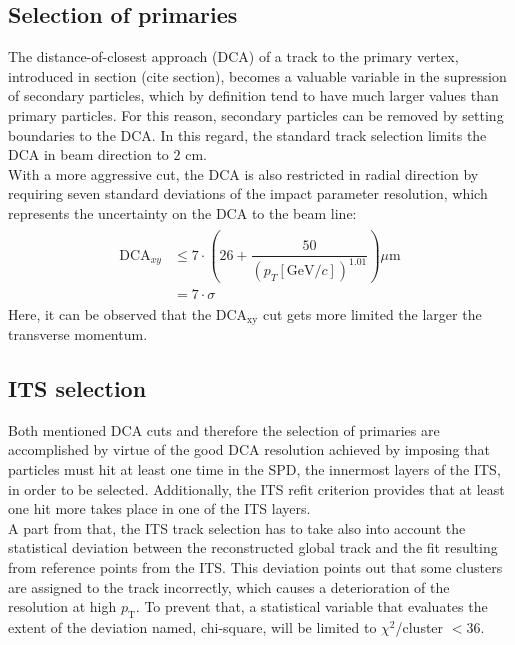 \documentclass[12pt,a4paper]{report}
\begin{document}
\subsection{Selection of primaries}
\label{sec:SelOfPrim}
The distance-of-closest approach (DCA) of a track to the primary vertex, introduced in section (cite section), becomes a valuable variable in the supression of secondary particles, which by definition tend to have much larger values than primary particles. For this reason, secondary particles can be removed by setting boundaries to the DCA. In this regard, the standard track selection limits the DCA in beam direction to $2$ cm.\\
With a more aggressive cut, the DCA is also restricted in radial direction by requiring seven standard deviations of the impact parameter resolution, which represents the uncertainty on the DCA to the beam line: %
\begin{align}
\begin{split}
\text{DCA}_{xy} &\leq 7 \cdot \left(26 + \dfrac{50}{(p_{T}[\text{GeV}/c])^{1.01}}\right) \mu \text{m} \\
& = 7\cdot \sigma
\end{split}
\end{align}
Here, it can be observed that the DCA$_{\text{xy}}$ cut gets more limited the larger the transverse momentum. 
\subsection{ITS selection}
Both mentioned DCA cuts and therefore the selection of primaries are accomplished by virtue of the good DCA resolution achieved by imposing that particles must hit at least one time in the SPD, the innermost layers of the ITS, in order to be selected. Additionally, the ITS refit criterion provides that at least one hit more takes place in one of the ITS layers. \\
A part from that, the ITS track selection has to take also into account the statistical deviation between the reconstructed global track and the fit resulting from reference points from the ITS. This deviation points out that some clusters are assigned to the track incorrectly, which causes a  deterioration of the \pt resolution at high $p_\text{T}$. To prevent that, a statistical variable that evaluates the extent of the deviation named, chi-square, will be limited to $\chi^2$/cluster $< 36$.
\end{document}
